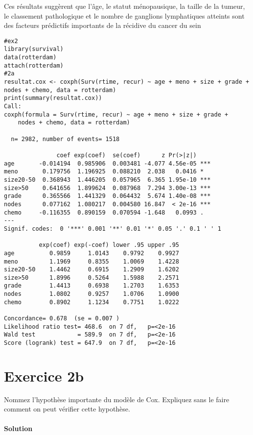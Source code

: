 \documentclass[../main.tex]{subfiles}
\begin{document}
\begin{CJK*}{UTF8}{gbsn}
Ces résultats suggèrent que l'âge, le statut ménopausique, la taille de la tumeur, le classement pathologique et le nombre de ganglions lymphatiques atteints sont des facteurs prédictifs importants de la récidive du cancer du sein

\begin{lstlisting}
#ex2
library(survival)
data(rotterdam)
attach(rotterdam)
#2a
resultat.cox <- coxph(Surv(rtime, recur) ~ age + meno + size + grade + nodes + chemo, data = rotterdam)
print(summary(resultat.cox))
Call:
coxph(formula = Surv(rtime, recur) ~ age + meno + size + grade + 
    nodes + chemo, data = rotterdam)

  n= 2982, number of events= 1518 

               coef exp(coef)  se(coef)      z Pr(>|z|)    
age       -0.014194  0.985906  0.003481 -4.077 4.56e-05 ***
meno       0.179756  1.196925  0.088210  2.038   0.0416 *  
size20-50  0.368943  1.446205  0.057965  6.365 1.95e-10 ***
size>50    0.641656  1.899624  0.087968  7.294 3.00e-13 ***
grade      0.365566  1.441329  0.064432  5.674 1.40e-08 ***
nodes      0.077162  1.080217  0.004580 16.847  < 2e-16 ***
chemo     -0.116355  0.890159  0.070594 -1.648   0.0993 .  
---
Signif. codes:  0 '***' 0.001 '**' 0.01 '*' 0.05 '.' 0.1 ' ' 1

          exp(coef) exp(-coef) lower .95 upper .95
age          0.9859     1.0143    0.9792    0.9927
meno         1.1969     0.8355    1.0069    1.4228
size20-50    1.4462     0.6915    1.2909    1.6202
size>50      1.8996     0.5264    1.5988    2.2571
grade        1.4413     0.6938    1.2703    1.6353
nodes        1.0802     0.9257    1.0706    1.0900
chemo        0.8902     1.1234    0.7751    1.0222

Concordance= 0.678  (se = 0.007 )
Likelihood ratio test= 468.6  on 7 df,   p=<2e-16
Wald test            = 589.9  on 7 df,   p=<2e-16
Score (logrank) test = 647.9  on 7 df,   p=<2e-16

\end{lstlisting}

\section*{Exercice 2b}
Nommez l'hypothèse importante du modèle de Cox. 
Expliquez sans le faire comment on peut vérifier cette hypothèse.

\paragraph{Solution}\


\end{CJK*}
\end{document}
